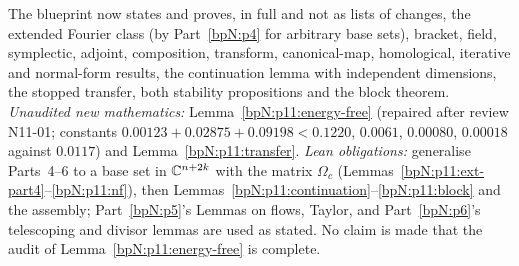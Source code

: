 \begin{remark}\label{bpN:p11:status}
The blueprint now states and proves, in full and not as lists of changes, the extended Fourier class (by Part~\ref{bpN:p4} for arbitrary base sets), bracket, field, symplectic, adjoint, composition, transform, canonical-map, homological, iterative and normal-form results, the continuation lemma with independent dimensions, the stopped transfer, both stability propositions and the block theorem. \emph{Unaudited new mathematics:} Lemma~\ref{bpN:p11:energy-free} (repaired after review N11-01; constants $0.00123+0.02875+0.09198<0.1220$, $0.0061$, $0.00080$, $0.00018$ against $0.0117$) and Lemma~\ref{bpN:p11:transfer}. \emph{Lean obligations:} generalise Parts~4--6 to a base set in $\mathbb{C}^{n+2k}$ with the matrix $\Omega_c$ (Lemmas~\ref{bpN:p11:ext-part4}--\ref{bpN:p11:nf}), then Lemmas~\ref{bpN:p11:continuation}--\ref{bpN:p11:block} and the assembly; Part~\ref{bpN:p5}'s Lemmas on flows, Taylor, and Part~\ref{bpN:p6}'s telescoping and divisor lemmas are used as stated. No claim is made that the audit of Lemma~\ref{bpN:p11:energy-free} is complete.
\end{remark}
\endgroup
